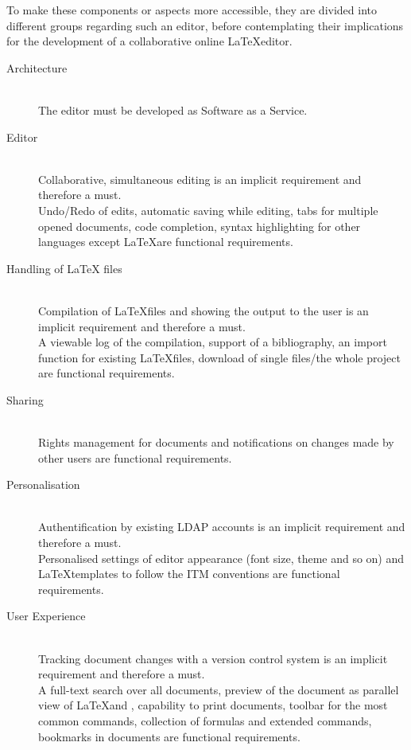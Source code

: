 To make these components or aspects more accessible, they are divided into different groups regarding such an editor, before contemplating their implications for the development of a collaborative online \LaTeX editor.

\begin{description}
	\item[Architecture] \hfill \\
		The editor must be developed as Software as a Service.
	\item[Editor] \hfill \\
		Collaborative, simultaneous editing is an implicit requirement and therefore a must. \\
		Undo/Redo of edits, automatic saving while editing, tabs for multiple opened documents, code completion, syntax highlighting for other languages except \LaTeX are functional requirements.
	\item[Handling of LaTeX files] \hfill \\
		Compilation of \LaTeX files and showing the output to the user is an implicit requirement and therefore a must. \\
		A viewable log of the compilation, support of a bibliography, an import function for existing \LaTeX files, download of single files/the whole project are functional requirements.
	\item[Sharing] \hfill \\
		Rights management for documents and notifications on changes made by other users are functional requirements.
	\item[Personalisation] \hfill \\
		Authentification by existing LDAP accounts is an implicit requirement and therefore a must. \\
		Personalised settings of editor appearance (font size, theme and so on) and \LaTeX \linebreak templates to follow the ITM conventions are functional requirements.
	\item[User Experience] \hfill \\
		Tracking document changes with a version control system is an implicit requirement and therefore a must. \\
		A full-text search over all documents, preview of the document as parallel view of \linebreak \LaTeX and , capability to print documents, toolbar for the most common commands, collection of formulas and extended commands, bookmarks in documents are functional requirements.
\end{description}


